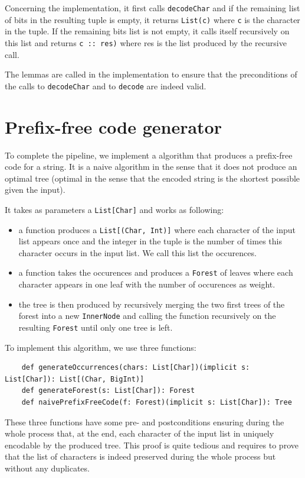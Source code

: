\documentclass[a4paper,UKenglish,cleveref, autoref, thm-restate]{lipics-v2021}
\begin{document}
\begin{enumerate}
Concerning the implementation, it first calls \lstinline{decodeChar} and if the remaining list of bits in the resulting tuple is empty, it returns \lstinline{List(c)} where \lstinline{c} is the character in the tuple. If the remaining bits list is not empty,
it calls itself recursively on this list and returns \lstinline{c :: res)} where res is the list produced by the recursive call.

The lemmas are called in the implementation to ensure that the preconditions of the calls to \lstinline{decodeChar} and to \lstinline{decode} are indeed valid.


\section{Prefix-free code generator} %
To complete the pipeline, we implement a algorithm that produces a prefix-free code for a string. It is a naive algorithm in the sense that it does not produce an optimal tree 
(optimal in the sense that the encoded string is the shortest possible given the input).

It takes as parameters a \lstinline{List[Char]} and works as following:
\begin{itemize}
    \item a function produces a \lstinline{List[(Char, Int)]} where each character of the input list appears once and the integer in the tuple is the number of times this character occurs in the input list. We call this list the occurences.
    \item a function takes the occurences and produces a \lstinline{Forest} of leaves where each character appears in one leaf with the number of occurences as weight.
    \item the tree is then produced by recursively merging the two first trees of the forest into a new \lstinline{InnerNode} and calling the function recursively on the resulting \lstinline{Forest} until only one tree is left.
\end{itemize}

To implement this algorithm, we use three functions:
\begin{lstlisting}
    def generateOccurrences(chars: List[Char])(implicit s: List[Char]): List[(Char, BigInt)]
    def generateForest(s: List[Char]): Forest
    def naivePrefixFreeCode(f: Forest)(implicit s: List[Char]): Tree
\end{lstlisting}

These three functions have some pre- and postconditions ensuring during the whole process that, at the end, each character of the input list in uniquely encodable by the produced tree.
This proof is quite tedious and requires to prove that the list of characters is indeed preserved during the whole process but without any duplicates.


\end{enumerate}
\end{document}
